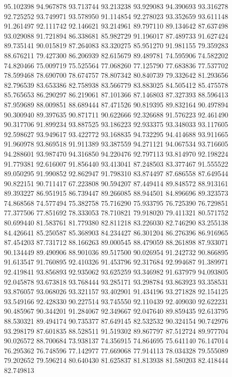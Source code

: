 95.102398
94.967878
93.713744
93.213238
93.929083
94.390693
93.316278
92.725252
93.749971
93.578950
91.114854
92.278023
93.352659
93.611148
91.261497
92.111742
92.146621
93.214961
89.797110
89.134642
87.637498
93.029088
91.721894
86.338681
85.982729
91.196017
87.489733
91.627424
89.735141
90.015819
87.264083
83.320275
85.951270
91.981155
79.359283
88.676211
79.427300
86.206939
82.615679
89.489781
74.595906
74.582202
74.820466
75.009719
75.525564
77.068260
77.125790
77.683836
77.537702
78.599468
78.690700
78.674757
78.807342
80.840739
79.332642
81.293656
82.796539
83.653386
82.758938
83.566779
83.883025
84.505412
85.475578
85.765653
86.290297
86.219061
87.101366
87.146803
87.327393
88.596413
87.959689
88.009851
88.689444
87.471526
90.819395
89.832164
90.497894
90.300940
89.397635
90.871711
90.622666
92.326688
91.576223
92.461490
90.317706
91.899234
93.887525
93.186223
92.933375
93.348033
93.117605
92.598627
93.949617
93.422772
93.168835
94.732295
94.414688
93.911665
91.960978
93.869518
91.911389
93.387559
94.271121
94.067534
93.716605
94.288601
93.987470
94.316850
94.220476
92.797113
93.814970
92.198224
91.779381
92.616007
91.856440
93.413041
87.248503
83.377467
91.555522
89.050295
91.990852
92.862947
91.798310
83.874497
87.686558
87.649544
90.822151
90.711417
67.223808
90.594207
87.449414
89.848572
88.913161
89.393227
86.951915
86.739447
89.266085
88.944501
84.896696
89.323573
74.868568
74.577494
75.382758
75.716290
75.933795
76.725390
76.729851
77.377506
77.851692
78.333053
78.710821
79.918020
79.411321
80.571752
80.699440
81.583761
81.779380
82.811218
83.226030
82.746290
83.255138
84.426641
85.250587
85.368903
84.234427
86.301204
86.276396
86.916965
87.454203
87.731712
88.166263
89.000545
88.479059
88.261898
87.933071
90.134449
89.490906
88.901036
89.517500
90.026954
91.242732
90.866895
91.613547
91.760895
92.410326
91.453796
92.317684
92.994687
91.389971
92.419841
93.856893
92.935062
93.625259
93.346982
91.637979
94.093805
92.045878
93.673818
93.768444
93.285171
93.298784
93.863923
93.358531
93.876057
93.068026
93.321157
93.402901
91.434196
93.271828
92.154125
93.549166
92.428330
90.227514
93.745550
92.110439
92.409030
92.622231
90.485967
90.344201
91.284067
92.349667
92.047640
89.859435
92.613795
88.530321
89.494174
90.735377
87.649145
82.532532
90.324154
90.742976
93.298179
87.601835
88.528511
91.519302
89.867797
87.512724
89.977704
90.026572
88.700684
73.938137
74.356915
74.864695
75.641140
76.147014
76.295362
76.748596
77.142977
77.669068
77.914113
78.034328
79.555089
79.202652
79.596214
80.640430
81.625837
81.813938
81.580203
82.418444
82.749813
